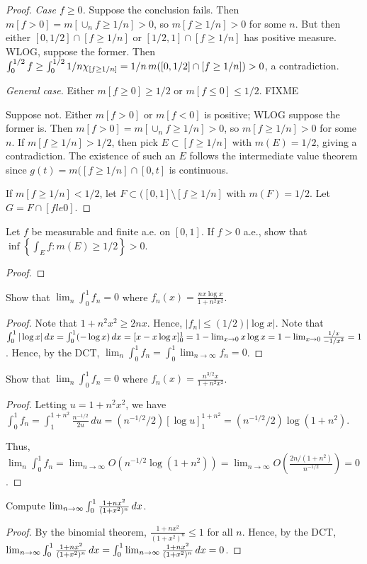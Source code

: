 \documentclass{article}
\begin{document}
\begin{proof}
\emph{Case $f \ge 0$.} Suppose the conclusion fails. Then $m[f>0] = m[\cup_n f \ge 1/n] > 0$, so $m[f \ge 1/n] > 0$ for some $n$. But then either $[0,1/2] \cap [f \ge 1/n]$ or $[1/2, 1] \cap [f \ge 1/n]$ has positive measure. WLOG, suppose the former.  Then $\int_0^{1/2} f \ge \int_0^{1/2} 1/n \chi_{[f \ge 1/n]} = 1/n \,m([0,1/2] \cap [f \ge 1/n]) > 0$, a contradiction.

\emph{General case.} Either $m[f \ge 0] \ge 1/2$ or $m[f \le 0] \le 1/2$. FIXME

Suppose not. Either $m[f >0]$ or $m[f < 0]$ is positive; WLOG suppose the former is. Then $m[f>0] = m[\cup_n f \ge 1/n] > 0$, so $m[f \ge 1/n] > 0$ for some $n$.
If $m[f \ge 1/n] > 1/2$, then pick $E \subset [f \ge 1/n]$ with $m(E) = 1/2$, giving a contradiction.  The existence of such an $E$ follows the intermediate value theorem since $g(t) = m( [f \ge 1/n] \cap [0,t]$ is continuous.

If $m[f \ge 1/n] < 1/2$, let $F \subset ([0,1] \setminus [f \ge 1/n]$ with $m(F) = 1/2$. Let $G = F \cap [f le 0]$.
\end{proof}
 Let $f$ be measurable and finite a.e. on $[0,1]$. If $f > 0$ a.e., show that $\inf \left\{ \int_E f : m(E) \ge 1/2 \right\} > 0$.
\begin{proof}
\end{proof}
 Show that $\lim_n \int_0^1 f_n = 0$ where $f_n(x) = \frac{nx \log x} {1 + n^2x^2}$.
\begin{proof}
Note that $1 + n^2x^2 \ge 2nx$. Hence, $|f_n| \le (1/2) |\log x|$. Note that $\int_0^1 |\log x| \,dx = \int_0^1 (-\log x) \,dx = [x - x \log x]_0^1 
= 1 - \lim_{x\to 0} x \log x = 1 - \lim_{x\to 0}  \frac {1/x} {-1/x^2} = 1$. Hence, by the DCT,
$\lim_n \int_0^1 f_n  = \int_0^1 \lim_{n\to\infty} f_n = 0$.
\end{proof}
 Show that $\lim_n \int_0^1 f_n = 0$ where $f_n(x) = \frac{n^{3/2} x} {1 + n^2x^2}$.
\begin{proof}
Letting $u = 1 + n^2 x^2$, we have $\int_0^1 f_n = \int_1^{1+n^2} \frac{n^{-1/2}}{2u} \,du = (n^{-1/2}/2) [\log u]_1^{1+n^2} = (n^{-1/2}/2) \log (1+n^2)$.

Thus, $\lim_n \int_0^1 f_n = \lim_{n\to\infty} O( n^{-1/2} \log (1+n^2)) = \lim_{n\to\infty} O( \frac{2n/(1+n^2)} {n^{-1/2}}) = 0$.
\end{proof}
 Compute $\lim_{n\to\infty} \int_0^1 \frac{ 1+ nx^2} {(1+x^2)^n} \,dx$.
\begin{proof} By the binomial theorem, $\frac{ 1+ nx^2} {(1+x^2)^n} \le 1$ for all $n$. 
Hence, by the DCT, $\lim_{n\to\infty} \int_0^1 \frac{ 1+ nx^2} {(1+x^2)^n} \,dx = \int_0^1 \lim_{n\to\infty} \frac{ 1+ nx^2} {(1+x^2)^n} \,dx = 0$.
\end{proof}
\end{document}
